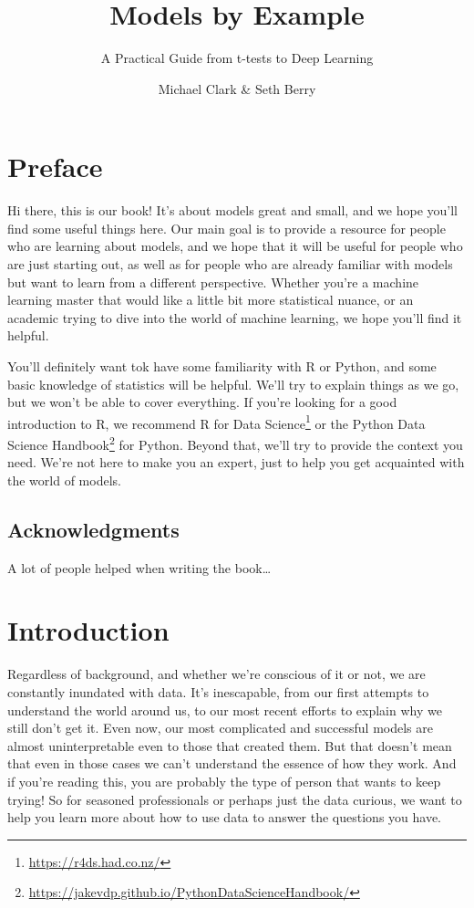 \documentclass[
  letterpaper,
]{krantz}
\title{Models by Example}
\subtitle{A Practical Guide from t-tests to Deep Learning}
\author{Michael Clark \& Seth Berry}
\date{}
\renewcommand*\contentsname{Table of contents}
\newcommand\contentsname{Table of contents}
\DeclareRobustCommand{\href}[2]{#2\footnote{\url{#1}}}
\begin{document}
\maketitle
\renewcommand*\contentsname{Contents}
{
\hypersetup{linkcolor=}
\setcounter{tocdepth}{2}
\tableofcontents
}

\chapter{Preface}\label{preface}

Hi there, this is our book! It's about models great and small, and we
hope you'll find some useful things here. Our main goal is to provide a
resource for people who are learning about models, and we hope that it
will be useful for people who are just starting out, as well as for
people who are already familiar with models but want to learn from a
different perspective. Whether you're a machine learning master that
would like a little bit more statistical nuance, or an academic trying
to dive into the world of machine learning, we hope you'll find it
helpful.

You'll definitely want tok have some familiarity with R or Python, and
some basic knowledge of statistics will be helpful. We'll try to explain
things as we go, but we won't be able to cover everything. If you're
looking for a good introduction to R, we recommend
\href{https://r4ds.had.co.nz/}{R for Data Science} or the
\href{https://jakevdp.github.io/PythonDataScienceHandbook/}{Python Data
Science Handbook} for Python. Beyond that, we'll try to provide the
context you need. We're not here to make you an expert, just to help you
get acquainted with the world of models.

\section{Acknowledgments}\label{acknowledgments}

A lot of people helped when writing the book\ldots{}


\chapter{Introduction}\label{introduction}

Regardless of background, and whether we're conscious of it or not, we
are constantly inundated with data. It's inescapable, from our first
attempts to understand the world around us, to our most recent efforts
to explain why we still don't get it. Even now, our most complicated and
successful models are almost uninterpretable even to those that created
them. But that doesn't mean that even in those cases we can't understand
the essence of how they work. And if you're reading this, you are
probably the type of person that wants to keep trying! So for seasoned
professionals or perhaps just the data curious, we want to help you
learn more about how to use data to answer the questions you have.
\end{document}
